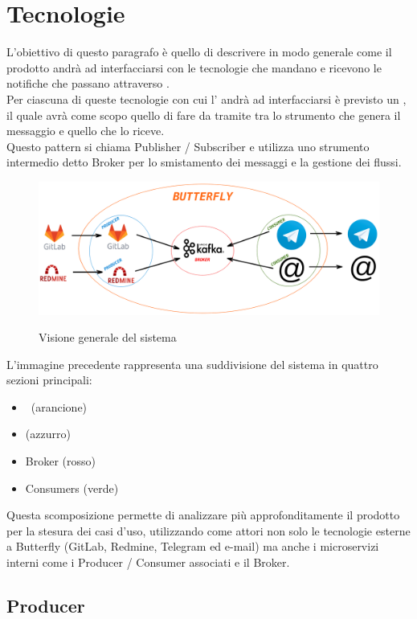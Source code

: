 \section{Tecnologie}
	L'obiettivo di questo paragrafo è quello di descrivere in modo generale come il prodotto andrà ad interfacciarsi con le tecnologie che mandano e ricevono le notifiche che passano attraverso \progetto.\\
	Per ciascuna di queste tecnologie con cui l' andrà ad interfacciarsi è previsto un , il quale avrà come scopo quello di fare da tramite tra lo strumento che genera il messaggio e quello che lo riceve.\\
	Questo pattern si chiama Publisher / Subscriber e utilizza uno strumento intermedio detto Broker per lo smistamento dei messaggi e la gestione dei flussi.

	\begin{figure}[H]
		\centering
		\includegraphics[width=\textwidth]{img/butterfly.png}\\
		\caption{Visione generale del sistema \progetto}
		\label{fig:butterfly}
	\end{figure}
	L'immagine precedente rappresenta una suddivisione del sistema in quattro sezioni principali:
	\begin{itemize}
		\item \progetto\ (arancione)
		\item {} (azzurro)
		\item Broker (rosso)
		\item Consumers (verde)
	\end{itemize}
	Questa scomposizione permette di analizzare più approfonditamente il prodotto per la stesura dei casi d'uso, utilizzando come attori non solo le tecnologie esterne a Butterfly (GitLab, Redmine, Telegram ed e-mail) ma anche i microservizi interni come i Producer / Consumer associati e il Broker.
	
	\subsection{Producer}
	
